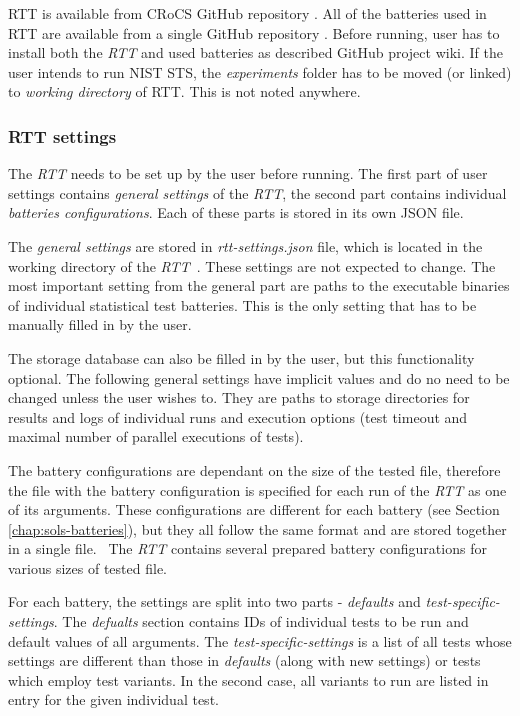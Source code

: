 \documentclass[
  digital,     %
  oneside,     %
  nosansbold,  %
  nocolorbold, %
  nolof,         %
  nolot,         %
]{fithesis4}
\begin{document}
RTT is available from CRoCS GitHub repository \cite{rtt-site}. All of the batteries used in RTT are available from a single GitHub repository \cite{rtt-batteries}. Before running, user has to install both the \emph{RTT} and used batteries as described GitHub project wiki. If the user intends to run NIST STS, the \emph{experiments} folder has to be moved (or linked) to \emph{working directory} of RTT. This is not noted anywhere.

\subsubsection{RTT settings}\label{rtt-settings} 
The \emph{RTT} needs to be set up by the user before running. The first part of user settings contains \emph{general settings} of the \emph{RTT}, the second part contains individual \emph{batteries configurations}. Each of these parts is stored in its own JSON file. 

The \emph{general settings} are stored in \emph{rtt-settings.json} file, which is located in the working directory of the \emph{RTT}~\cite[p.~10]{rtt-obratil}. These settings are not expected to change. The most important setting from the general part are paths to the executable binaries of individual statistical test batteries. This is the only setting that has to be manually filled in by the user.

The storage database can also be filled in by the user, but this functionality optional. The following general settings have implicit values and do no need to be changed unless the user wishes to. They are paths to storage directories for results and logs of individual runs and execution options (test timeout and maximal number of parallel executions of tests). 

The battery configurations are dependant on the size of the tested file, therefore the file with the battery configuration is specified for each run of the \emph{RTT} as one of its arguments. These configurations are different for each battery (see Section \ref{chap:sols-batteries}), but they all follow the same format and are stored together in a single file.~\cite[p.~11]{rtt-obratil} The \emph{RTT} contains several prepared battery configurations for various sizes of tested file.

For each battery, the settings are split into two parts - \emph{defaults} and \emph{test-specific-settings}. The \emph{defualts} section contains IDs of individual tests to be run and default values of all arguments. The \emph{test-specific-settings} is a list of all tests whose settings are different than those in \emph{defaults} (along with new settings) or tests which employ test variants. In the second case, all variants to run are listed in entry for the given individual test.
\end{document}
